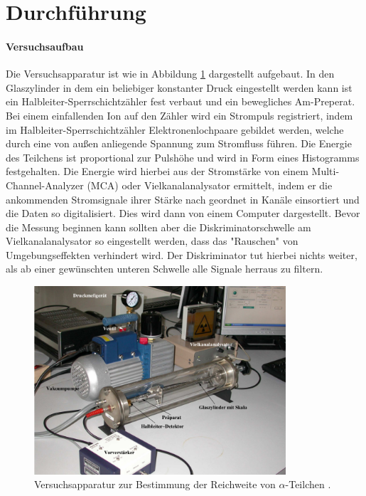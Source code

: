 \section{Durchführung}
\label{sec:Durchführung}
\paragraph{Versuchsaufbau}
Die Versuchsapparatur ist wie in Abbildung \ref{fig:VB} dargestellt aufgebaut.
In den Glaszylinder in dem ein beliebiger konstanter Druck eingestellt werden kann
ist ein Halbleiter-Sperrschichtzähler fest verbaut und ein bewegliches Am-Preperat.
Bei einem einfallenden Ion auf den Zähler wird ein Strompuls registriert, indem im Halbleiter-Sperrschichtzähler Elektronenlochpaare gebildet werden, welche durch eine von außen anliegende Spannung zum Stromfluss führen.
Die Energie des Teilchens ist proportional zur Pulshöhe und wird in Form eines
Histogramms festgehalten. Die Energie wird hierbei aus der Stromstärke von einem Multi-Channel-Analyzer (MCA) oder Vielkanalanalysator ermittelt, indem er die ankommenden Stromsignale ihrer Stärke nach geordnet in Kanäle einsortiert und die Daten so digitalisiert. Dies wird dann von einem Computer dargestellt. Bevor die Messung beginnen kann sollten aber die Diskriminatorschwelle am Vielkanalanalysator
so eingestellt werden, dass das "Rauschen" von Umgebungseffekten verhindert wird. Der Diskriminator tut hierbei nichts weiter, als ab einer gewünschten unteren Schwelle alle Signale herraus zu filtern.

\begin{figure}
  \centering
  \includegraphics[height=7cm]{logos/Versuchsaufbau.png}
  \caption{Versuchsapparatur zur Bestimmung der Reichweite von \texorpdfstring{$\alpha$}{math}-Teilchen \cite{Anleitung}.}
  \label{fig:VB}
\end{figure}
